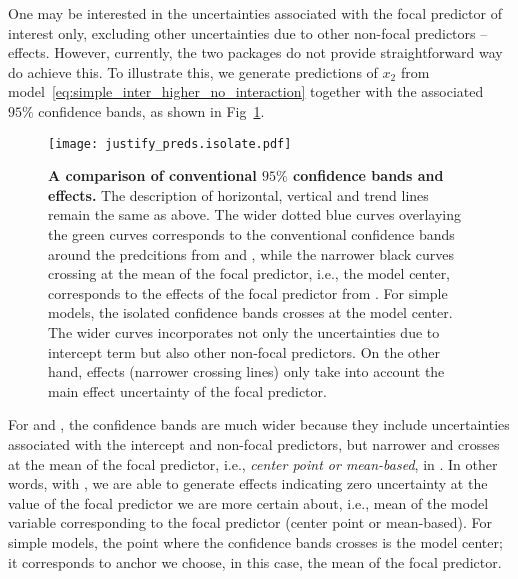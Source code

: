 One may be interested in the uncertainties associated with the focal predictor of interest only, excluding other uncertainties due to other non-focal predictors -- effects. However, currently, the two packages do not provide straightforward way do achieve this. To illustrate this, we generate predictions of $x_2$ from model~\ref{eq:simple_inter_higher_no_interaction} together with the associated $95\%$ confidence bands, as shown in Fig~\ref{fig:justify_ci_plots}. 

\begin{figure}[h]
\begin{center}
\texttt{[image: justify\_preds.isolate.pdf]}
\end{center}
\caption{{\bf A comparison of conventional $95\%$ confidence bands and effects.} The description of horizontal, vertical and trend lines remain the same as above. The wider dotted blue curves overlaying the green curves corresponds to the conventional confidence bands around the predcitions from  and , while the narrower black curves crossing at the mean of the focal predictor, i.e., the model center, corresponds to the effects of the focal predictor from . For simple models, the isolated confidence bands crosses at the model center. The wider curves incorporates not only the uncertainties due to intercept term but also other non-focal predictors. On the other hand, effects (narrower crossing lines) only take into account the main effect uncertainty of the focal predictor.}
\label{fig:justify_ci_plots}
\end{figure}

For  and , the confidence bands are much wider because they include uncertainties associated with the intercept and non-focal predictors, but narrower and crosses at the mean of the focal predictor, i.e., \emph{center point or mean-based}, in . In other words, with , we are able to generate effects indicating zero uncertainty at the value of the focal predictor we are more certain about, i.e., mean of the model variable corresponding to the focal predictor (center point or mean-based). For simple models, the point where the confidence bands crosses is the model center; it corresponds to anchor we choose, in this case, the mean of the focal predictor.


